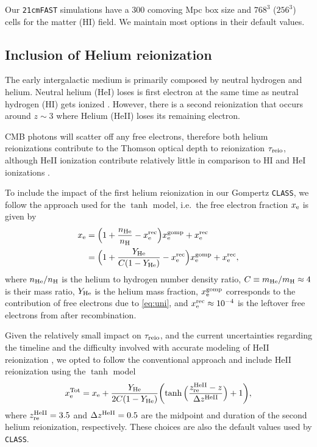 Our \texttt{21cmFAST} simulations have a 300 comoving Mpc box size and
$768^3$ ($256^3$) cells for the matter (HI) field.
We maintain most options in their default values.



\subsection*{Inclusion of Helium reionization}
\label{ssec:helium}

The early intergalactic medium is primarily composed by neutral hydrogen
and helium.
Neutral helium (HeI) loses is first electron at the same time as neutral
hydrogen (HI) gets ionized \cite{Trac2007}.
However, there is a second reionization that occurs around $z\sim3$
where Helium (HeII) loses its remaining electron.

CMB photons will scatter off any free electrons, therefore both helium
reionizations contribute to the Thomson optical depth to reionization
$\tau_{\mathrm{reio}}$, although HeII ionization contribute relatively little in
comparison to HI and HeI ionizations \cite{Liu2016}.

To include the impact of the first helium reionization in our Gompertz
\texttt{CLASS}, we follow the approach used for the $\tanh$ model, i.e.\
the free electron fraction $x_{\mathrm{e}}$ is given by
%
\begin{align}
\label{eq:xe_H_He}
x_\e
&= \Bigl(1 + \frac{n_\He}{n_\mathrm{H}} - x^\rec_\e\Bigr) x_\e^\gomp
  + x^\rec_\e
\nonumber\\
%
&= \Bigl(1 + \frac{Y_\He}{C (1 - Y_\He)} - x^\rec_\e\Bigr) x_\e^\gomp
  + x^\rec_\e,
\end{align}
%
where $n_{\mathrm{He}} / n_\mathrm{H}$ is the helium to hydrogen number density
ratio, $C \equiv m_{\mathrm{He}} / m_\mathrm{H} \approx 4$ is their mass ratio,
$Y_{\mathrm{He}}$ is the helium mass fraction, $x_{\mathrm{e}}^{\mathrm{gomp}}$ corresponds to the
contribution of free electrons due to \cref{eq:uni}, and $x^{\mathrm{rec}}_{\mathrm{e}}
\approx 10^{-4}$ is the leftover free electrons from after
recombination.

Given the relatively small impact on $\tau_{\mathrm{reio}}$, and the current
uncertainties regarding the timeline and the difficulty involved with
accurate modeling of HeII reionization \cite{Hotinli2023, Upton2020}, we
opted to follow the conventional approach and include HeII reionization
using the $\tanh$ model
%
\begin{equation}
\label{eq:xe_tot}
x_{\mathrm{e}}^\mathrm{Tot} = x_{\mathrm{e}} + \frac{Y_{\mathrm{He}}}{2C(1 - Y_{\mathrm{He}})}
  \biggl(\tanh{\Bigl(\frac{z_{\mathrm{re}}^{\mathrm{HeII}}- z}{\Delta z^{\mathrm{HeII}}}\Bigr)} + 1\biggr),
\end{equation}
%
where $z_{\mathrm{re}}^{\mathrm{HeII}} = 3.5$ and $\Delta z^{\mathrm{HeII}} = 0.5$ are the midpoint
and duration of the second helium reionization, respectively.
These choices are also the default values used by \texttt{CLASS}.


